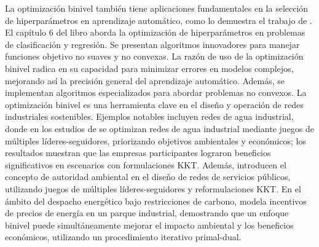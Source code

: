 La optimización binivel también tiene aplicaciones fundamentales en la selección de hiperparámetros en aprendizaje automático, como lo demuestra el trabajo de \cite{DempeyZemkoho2020ML}. El capítulo 6 del libro aborda la optimización de hiperparámetros en problemas de clasificación y regresión. Se presentan algoritmos innovadores para manejar funciones objetivo no suaves y no convexas. La razón de uso de la optimización binivel radica en su capacidad para minimizar errores en modelos complejos, mejorando así la precisión general del aprendizaje automático. Además, se implementan algoritmos especializados para abordar problemas no convexos.
La optimización binivel es una herramienta clave en el diseño y operación de redes industriales sostenibles. Ejemplos notables incluyen redes de agua industrial,
donde en los estudios de \cite{Ramos2016WaterII} se optimizan redes de agua industrial mediante juegos de múltiples líderes-seguidores, priorizando objetivos ambientales y económicos; los resultados muestran que las empresas participantes lograron beneficios significativos en escenarios con formulaciones KKT.
Además, \cite{Ramos2018UtilityNO} introducen el concepto de autoridad ambiental en el diseño de redes de servicios públicos, utilizando juegos de múltiples líderes-seguidores y reformulaciones KKT.
En el ámbito del despacho energético bajo restricciones de carbono, \cite{Gu2020BilevelOL} modela incentivos de precios de energía en un parque industrial, demostrando que un enfoque binivel puede simultáneamente mejorar el impacto ambiental y los beneficios económicos, utilizando un procedimiento iterativo primal-dual.

